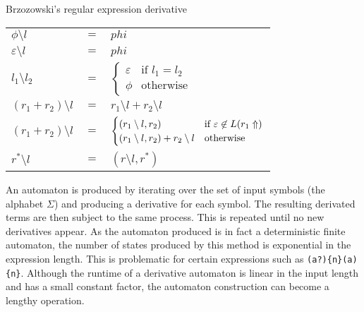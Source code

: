 \begin{defn}
   \label{defn-deriv}
   Brzozowski's regular expression derivative

   \begin{tabular}{lrl}
      $\phi \setminus l$	& $=$	& $phi$	\\
      $\varepsilon \setminus l$	& $=$	& $phi$	\\
      $l_1 \setminus l_2$	& $=$	&
          $\begin{cases}
             \varepsilon & \text{if } l_1 = l_2 \\
             \phi & \text{otherwise}
          \end{cases}$	\\
      $(r_1 + r_2) \setminus l$	& $=$	& $r_1 \setminus l + r_2 \setminus l$	\\
      $(r_1 + r_2) \setminus l$	& $=$	&
          $\begin{cases}
             (r_1 \setminus l, r_2) & \text{if } \varepsilon \not\in L(r_1\Uparrow) \\
             (r_1 \setminus l, r_2) + r_2 \setminus l & \text{otherwise}
          \end{cases}$	\\
      $r^* \setminus l$		& $=$	& $(r \setminus l, r^*)$	\\
   \end{tabular}
\end{defn}

An automaton is produced by iterating over the set of input symbols (the
alphabet $\Sigma$) and producing a derivative for each symbol. The resulting
derivated terms are then subject to the same process. This is repeated until no
new derivatives appear. As the automaton produced is in fact a deterministic
finite automaton, the number of states produced by this method is exponential in
the expression length. This is problematic for certain expressions such as
\verb!(a?){n}(a){n}!. Although the runtime of a derivative automaton is linear
in the input length and has a small constant factor, the automaton construction
can become a lengthy operation.


